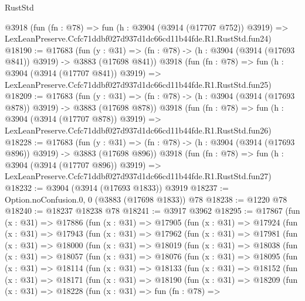 \begin{lexlean}{RustStd}
\begin{coremodule}
    @3918
    (fun (fn : @78) =>
    fun (h : @3904 (@3914 (@17707 @752)) @3919) =>
    LexLeanPreserve.Ccfc71ddbf027d937d1dc66cd11b44fde.R1.RustStd.fun24)
@18190 := @17683
    (fun (y : @31) => (fn : @78) -> (h : @3904 (@3914 (@17693 @841)) @3919) -> @3883 (@17698 @841))
    @3918
    (fun (fn : @78) =>
    fun (h : @3904 (@3914 (@17707 @841)) @3919) =>
    LexLeanPreserve.Ccfc71ddbf027d937d1dc66cd11b44fde.R1.RustStd.fun25)
@18209 := @17683
    (fun (y : @31) => (fn : @78) -> (h : @3904 (@3914 (@17693 @878)) @3919) -> @3883 (@17698 @878))
    @3918
    (fun (fn : @78) =>
    fun (h : @3904 (@3914 (@17707 @878)) @3919) =>
    LexLeanPreserve.Ccfc71ddbf027d937d1dc66cd11b44fde.R1.RustStd.fun26)
@18228 := @17683
    (fun (y : @31) => (fn : @78) -> (h : @3904 (@3914 (@17693 @896)) @3919) -> @3883 (@17698 @896))
    @3918
    (fun (fn : @78) =>
    fun (h : @3904 (@3914 (@17707 @896)) @3919) =>
    LexLeanPreserve.Ccfc71ddbf027d937d1dc66cd11b44fde.R1.RustStd.fun27)
@18232 := @3904 (@3914 (@17693 @1833)) @3919
@18237 := Option.noConfusion.{0, 0} (@3883 (@17698 @1833)) @78
@18238 := @1220 @78
@18240 := @18237 @18238 @78
@18241 := @3917 @3962
@18295 := @17867
    (fun (x : @31) =>
    @17886
      (fun (x : @31) =>
      @17905
        (fun (x : @31) =>
        @17924
          (fun (x : @31) =>
          @17943
            (fun (x : @31) =>
            @17962
              (fun (x : @31) =>
              @17981
                (fun (x : @31) =>
                @18000
                  (fun (x : @31) =>
                  @18019
                    (fun (x : @31) =>
                    @18038
                      (fun (x : @31) =>
                      @18057
                        (fun (x : @31) =>
                        @18076
                          (fun (x : @31) =>
                          @18095
                            (fun (x : @31) =>
                            @18114
                              (fun (x : @31) =>
                              @18133
                                (fun (x : @31) =>
                                @18152
                                  (fun (x : @31) =>
                                  @18171
                                    (fun (x : @31) =>
                                    @18190
                                      (fun (x : @31) =>
                                      @18209
                                        (fun (x : @31) =>
                                        @18228
                                          (fun (x : @31) =>
                                          fun (fn : @78) =>

\end{coremodule}
\end{lexlean}
